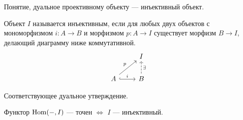 \documentclass[../main.tex]{subfiles}
\begin{document}
Понятие, дуальное проективному объекту --- инъективный объект.
\begin{to_def}\label{injective_def}
Объект $I$ называется инъективным, если для любых двух объектов с мономорфизмом $i:A\to B$ и морфизмом $p:A\to I$ существует морфизм $B\to I$, делающий диаграмму ниже коммутативной.
\begin{equation}\label{injective_def_diagram}
\begin{tikzcd}
	& I \\
	A & B
	\arrow["i", hook, from=2-1, to=2-2]
	\arrow["p", from=2-1, to=1-2]
	\arrow["\exists"', dashed, from=2-2, to=1-2]
\end{tikzcd}
\end{equation}
\end{to_def}
Соответствующее дуальное утверждение.
\begin{to_suj}
Функтор $\operatorname{Hom}(-, I)$ --- точен $\iff$ $I$ --- инъективный.
\end{to_suj}
\end{document}
